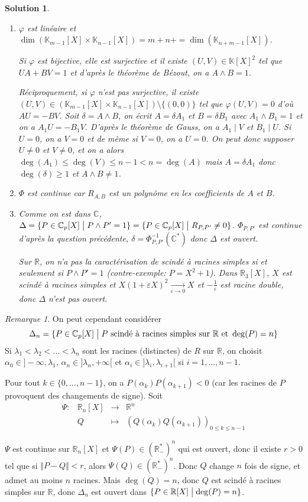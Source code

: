 \documentclass[12pt]{article}
\newtheorem{solution}{Solution}[section]
\theoremstyle{remark}
\newtheorem{remark}{Remarque}[section]
\newcommand{\K}{\mathbb{K}} \newcommand{\R}{\mathbb{R}}
\newcommand{\C}{\mathbb{C}} \newcommand{\Q}{\mathbb{Q}}
\newcommand{\function}[5]{
	$$
	\begin{array}{rccl}
		#1: & #2 & \to & #3 \\
		& #4 & \mapsto & #5
	\end{array}
	$$
}
\numberwithin{equation}{section}
\begin{document}
\begin{solution}
	\phantom{}
	\begin{enumerate}
		\item $\varphi$ est linéaire et $\dim(\K_{m-1}[X]\times\K_{n-1}[X])=m+n+=\dim(\K_{n+m-1}[X])$.
		
		Si $\varphi$ est bijective, elle est surjective et il existe $(U,V)\in\K[X]^{2}$ tel que $UA+BV=1$ et d'après le théorème de Bézout, on a $A\wedge B=1$.

		Réciproquement, si $\varphi$ n'est pas surjective, il existe $(U,V)\in(\K_{m-1}[X]\times\K_{n-1}[X])\setminus\{(0,0)\}$ tel que $\varphi(U,V)=0$ d'où $AU=-BV$. Soit $\delta=A\wedge B$, on écrit $A=\delta A_{1}$ et $B=\delta B_{1}$ avec $A_{1}\wedge B_{1}=1$ et on a $A_{1}U=-B_{1}V$. D'après le théorème de Gauss, on a $A_{1}\mid V$ et $B_{1}\mid U$. Si $U=0$, on a $V=0$ et de même si $V=0$, on a $U=0$. On peut donc supposer $U\neq0$ et $V\neq 0$, et on a alors $\deg(A_{1})\leqslant\deg(V)\leqslant n-1<n=\deg(A)$ mais $A=\delta A_{1}$ donc $\deg(\delta)\geqslant1$ et $A\wedge B\neq 1$.

		\item $\Phi$ est continue car $R_{A,B}$ est un polynôme en les coefficients de $A$ et $B$.
		
		\item Comme on est dans $\C$, $\Delta=\{P\in\C_{p}[X]\bigm| P\wedge P'=1\}=\{P\in\C_p[X]\bigm| R_{P,P'}\neq0\}$. $\Phi_{P,P'}$ est continue d'après la question précédente, $\delta=\Phi_{P,P'}^{-1}(\C^{*})$ donc $\Delta$ est ouvert.
		
		Sur $\R$, on n'a pas la caractérisation de scindé à racines simples si et seulement si $P\wedge P'=1$ (contre-exemple: $P=X^{2}+1$). Dans $\R_{3}[X]$, $X$ est scindé à racines simples et $X(1+\varepsilon X)^{2}\xrightarrow[\varepsilon\to0]{}X$ et $-\frac{1}{\varepsilon}$ est racine double, donc $\Delta$ n'est pas ouvert.
	\end{enumerate}
\end{solution}

\begin{remark}
	On peut cependant considérer 
	$$\Delta_{n}=\{P\in\C_{p}[X]\bigm| P\text{ scindé à racines simples sur }\R\text{ et }\deg(P)=n\}$$
	Si $\lambda_{1}<\lambda_{2}<\dots<\lambda_{n}$ sont les racines (distinctes) de $R$ sur $\R$, on choisit $\alpha_{0}\in]-\infty,\lambda_{1}$, $\alpha_{n}\in]\lambda_{n},+\infty[$ et $\alpha_{i}\in]\lambda_{i},\lambda_{i+1}[$ si $i=1,\dots,n-1$. 

	Pour tout $k\in\{0,\dots,n-1\}$, on a $P(\alpha_{k})P(\alpha_{k+1})<0$ (car les racines de $P$ provoquent des changements de signe). Soit \function{\Psi}{\R_n[X]}{\R^n}{Q}{(Q(\alpha_{k})Q(\alpha_{k+1}))_{0\leqslant k\leqslant n-1}}
	$\Psi$ est continue sur $\R_{n}[X]$ et $\Psi(P)\in(\R_{-}^{*})^{n}$ qui est ouvert, donc il existe $r>0$ tel que si $\Vert P-Q\Vert<r$, alors $\Psi(Q)\in(\R_{-}^{*})^{n}$. Donc $Q$ change $n$ fois de signe, et admet au moins $n$ racines. Mais $\deg(Q)=n$, donc $Q$ est scindé à racines simples sur $\R$, donc $\Delta_{n}$ est ouvert dans $\{P\in\R[X]\bigm|\deg(P)=n\}$.
\end{remark}
\end{document}
